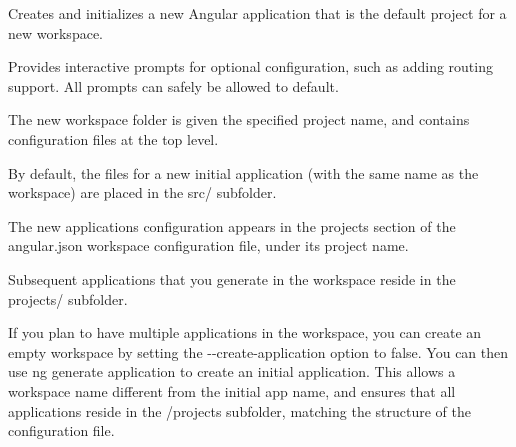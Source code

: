 Creates and initializes a new Angular application that is the default project for a new workspace.

Provides interactive prompts for optional configuration, such as adding routing support. All prompts can safely be allowed to default.


\begin{DoxyItemize}
\item The new workspace folder is given the specified project name, and contains configuration files at the top level.
\item By default, the files for a new initial application (with the same name as the workspace) are placed in the {\ttfamily src/} subfolder.
\item The new application\textquotesingle{}s configuration appears in the {\ttfamily projects} section of the {\ttfamily angular.\+json} workspace configuration file, under its project name.
\item Subsequent applications that you generate in the workspace reside in the {\ttfamily projects/} subfolder.
\end{DoxyItemize}

If you plan to have multiple applications in the workspace, you can create an empty workspace by setting the {\ttfamily -\/-\/create-\/application} option to false. You can then use {\ttfamily ng generate application} to create an initial application. This allows a workspace name different from the initial app name, and ensures that all applications reside in the {\ttfamily /projects} subfolder, matching the structure of the configuration file. 